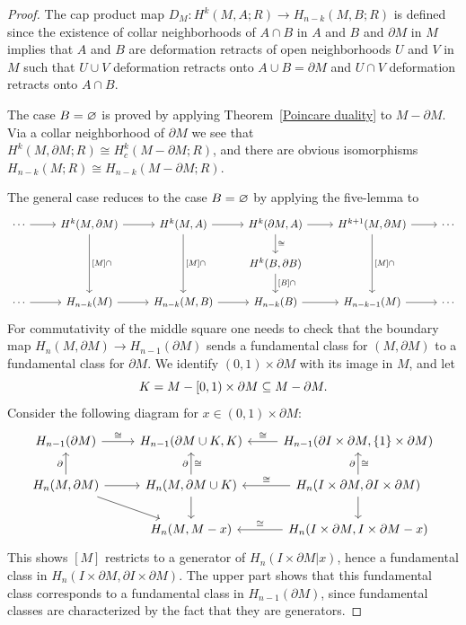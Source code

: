 \begin{proof}
The cap product map $D_M:H^k(M,A;R)\to H_{n-k}(M,B;R)$ is defined since the
existence of collar neighborhoods of $A\cap B$ in $A$ and $B$ and $\partial M$ in $M$ implies that $A$ and $B$ are deformation retracts of open neighborhoods $U$ and $V$ in $M$ such that $U\cup V$ deformation retracts onto $A\cup B=\partial M$ and $U\cap V$ deformation retracts onto $A\cap B$.\par
The case $B=\varnothing$ is proved by applying Theorem~\ref{Poincare duality} to $M-\partial M$. Via a collar neighborhood of $\partial M$ we see that $H^k(M,\partial M;R)\cong H^k_c(M-\partial M;R)$, and there are obvious isomorphisms $H_{n-k}(M;R)\cong H_{n-k}(M-\partial M;R)$.\par
The general case reduces to the case $B=\varnothing$ by applying the five-lemma to \[\begin{tikzcd}
\cdots\ar[r]&H^k(M,\partial M)\ar[dd,"{[M]\cap}"]\ar[r]&H^k(M,A)\ar[dd,"{[M]\cap}"]\ar[r]&H^k(\partial M,A)\ar[d,"\cong"]\ar[r]&H^{k+1}(M,\partial M)\ar[dd,"{[M]\cap}"]\ar[r]&\cdots\\
&&&H^k(B,\partial B)\ar[d,"{[B]\cap}"]&&\\
\cdots\ar[r]&H_{n-k}(M)\ar[r]&H_{n-k}(M,B)\ar[r]&H_{n-k}(B)\ar[r]&H_{n-k-1}(M)\ar[r]&\cdots
\end{tikzcd}\]
For commutativity of the middle square one needs to check that the boundary map $H_n(M,\partial M)\to H_{n-1}(\partial M)$ sends a fundamental class for $(M,\partial M)$ to a fundamental class for $\partial M$. We identify $(0,1)\times\partial M$ with its image in $M$, and let
\[K=M-[0,1)\times\partial M\subseteq M-\partial M.\]
Consider the following diagram for $x\in(0,1)\times\partial M$:
\[\begin{tikzcd}
H_{n-1}(\partial M)\ar[r,"\cong"]&H_{n-1}(\partial M\cup K,K)&H_{n-1}(\partial I\times\partial M,\{1\}\times\partial M)\ar[l,swap,"\cong"]\\
H_n(M,\partial M)\ar[u,"\partial"]\ar[rd]\ar[r]&H_n(M,\partial M\cup K)\ar[u,"\partial","\cong"']\ar[d]&H_{n}(I\times\partial M,\partial I\times\partial M)\ar[l,swap,"\cong"]\ar[u,"\partial","\cong"']\ar[d]\\
&H_n(M,M-x)&H_{n}(I\times\partial M,I\times\partial M-x)\ar[l,swap,"\cong"]
\end{tikzcd}\]
This shows $[M]$ restricts to a generator of $H_{n}(I\times\partial M|x)$, hence a fundamental class in $H_n(I\times\partial M,\partial I\times\partial M)$. The upper part shows that this fundamental class corresponds to a fundamental class in $H_{n-1}(\partial M)$, since fundamental classes are characterized by the fact that they are generators.
\end{proof}
